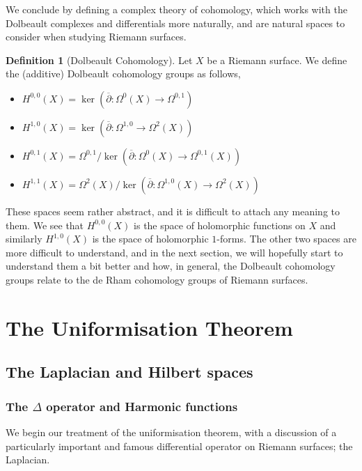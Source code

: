 \documentclass[11pt]{report}
\theoremstyle{definition}
\newtheorem{defn}[thm]{Definition}
\begin{document}
We conclude by defining a complex theory of cohomology, which works with the Dolbeault complexes and differentials more naturally, and are natural spaces to consider when studying Riemann surfaces.
\begin{defn}[Dolbeault Cohomology]
  Let $X$ be a Riemann surface. We define the (additive) Dolbeault cohomology groups as follows,
  \begin{itemize}
    \item $H^{0,0}(X) = \ker(\overline{\partial}:\Omega^0(X)\rightarrow \Omega^{0,1})$
    \item $H^{1,0}(X) = \ker(\overline{\partial}:\Omega^{1,0}\rightarrow \Omega^2(X))$
    \item $H^{0,1}(X) = \Omega^{0,1}/\ker(\overline{\partial}:\Omega^0(X)\rightarrow \Omega^{0,1}(X))$
    \item $H^{1,1}(X) = \Omega^2(X)/\ker(\overline{\partial}:\Omega^{1,0}(X) \rightarrow \Omega^2(X))$
  \end{itemize}
\end{defn}
These spaces seem rather abstract, and it is difficult to attach any meaning to them. We see that $H^{0,0}(X)$ is the space of holomorphic functions on $X$ and similarly $H^{1,0}(X)$ is the space of holomorphic $1$-forms. The other two spaces are more difficult to understand, and in the next section, we will hopefully start to understand them a bit better and how, in general, the Dolbeault cohomology groups relate to the de Rham cohomology groups of Riemann surfaces.

\newpage
\chapter{The Uniformisation Theorem}
\section{The Laplacian and Hilbert spaces}
\subsection{The $\Delta$ operator and Harmonic functions}
We begin our treatment of the uniformisation theorem, with a discussion of a particularly important and famous differential operator on Riemann surfaces; the Laplacian.
\end{document}
